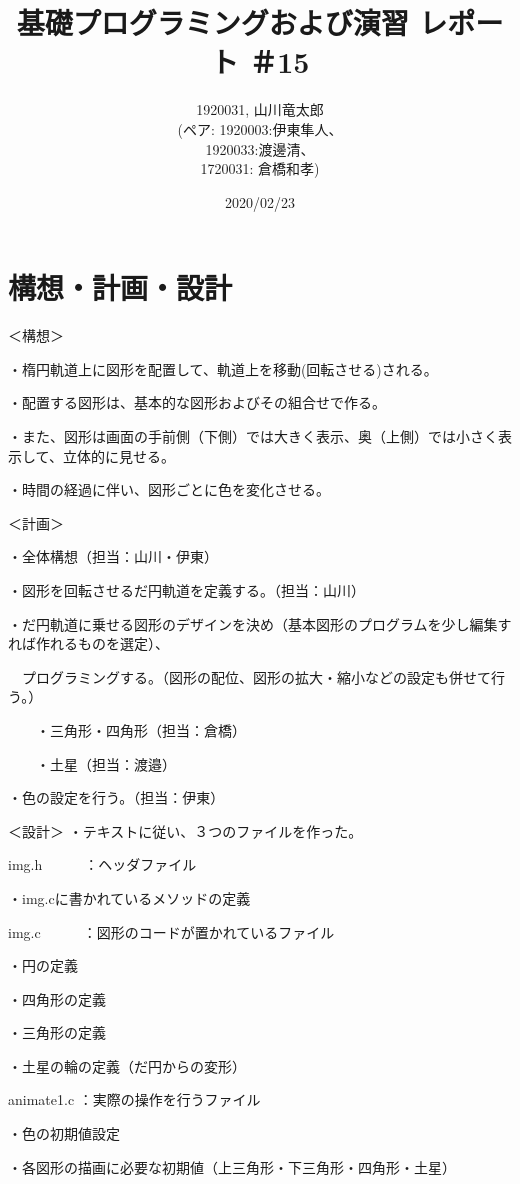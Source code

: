 \documentclass[12pt,a4j]{jarticle}
\begin{document}
\title{基礎プログラミングおよび演習 レポート ＃15}
\author{1920031, 山川竜太郎 \\ (ペア: 1920003:伊東隼人、\\ 1920033:渡邊清、\\ 1720031: 倉橋和孝)}
\date{2020/02/23}
\maketitle

\section{構想・計画・設計}

＜構想＞

・楕円軌道上に図形を配置して、軌道上を移動(回転させる)される。

・配置する図形は、基本的な図形およびその組合せで作る。

・また、図形は画面の手前側（下側）では大きく表示、奥（上側）では小さく表示して、立体的に見せる。

・時間の経過に伴い、図形ごとに色を変化させる。

＜計画＞

・全体構想（担当：山川・伊東）

・図形を回転させるだ円軌道を定義する。（担当：山川）

・だ円軌道に乗せる図形のデザインを決め（基本図形のプログラムを少し編集すれば作れるものを選定）、

　プログラミングする。（図形の配位、図形の拡大・縮小などの設定も併せて行う。）

　　・三角形・四角形（担当：倉橋）

　　・土星（担当：渡邉）

・色の設定を行う。（担当：伊東）

＜設計＞
・テキストに従い、３つのファイルを作った。

img.h　　　：ヘッダファイル

・img.cに書かれているメソッドの定義

img.c　　　：図形のコードが置かれているファイル

・円の定義

・四角形の定義

・三角形の定義

・土星の輪の定義（だ円からの変形）

animate1.c ：実際の操作を行うファイル

・色の初期値設定

・各図形の描画に必要な初期値（上三角形・下三角形・四角形・土星）
\end{document}
